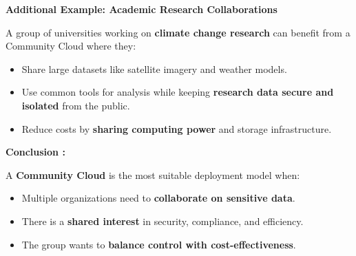 \documentclass[12pt]{article}
\begin{document}
\textbf{Additional Example: Academic Research Collaborations}

A group of universities working on \textbf{climate change research} can
benefit from a Community Cloud where they:

\begin{itemize}
\item
  Share large datasets like satellite imagery and weather models.
\item
  Use common tools for analysis while keeping \textbf{research data
  secure and isolated} from the public.
\item
  Reduce costs by \textbf{sharing computing power} and storage
  infrastructure.
\end{itemize}

\textbf{Conclusion :}

A \textbf{Community Cloud} is the most suitable deployment model when:

\begin{itemize}
\item
  Multiple organizations need to \textbf{collaborate on sensitive data}.
\item
  There is a \textbf{shared interest} in security, compliance, and
  efficiency.
\item
  The group wants to \textbf{balance control with cost-effectiveness}.
\end{itemize}
\end{document}
